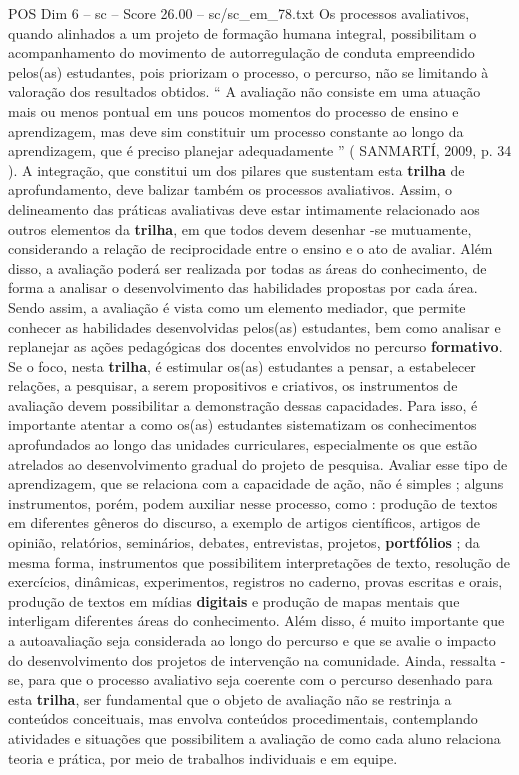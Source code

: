 \begin{textsample}{POS Dim 6 – sc – Score 26.00 – sc/sc\_em\_78.txt}
Os processos avaliativos, quando alinhados a um projeto de formação humana integral, possibilitam o acompanhamento do movimento de autorregulação de conduta empreendido pelos(as) estudantes, pois priorizam o processo, o percurso, não se limitando à valoração dos resultados obtidos. “ A avaliação não consiste em uma atuação mais ou menos pontual em uns poucos momentos do processo de ensino e aprendizagem, mas deve sim constituir um processo constante ao longo da aprendizagem, que é preciso planejar adequadamente ” ( SANMARTÍ, 2009, p. 34 ).
A integração, que constitui um dos pilares que sustentam esta \textbf{trilha} de aprofundamento, deve balizar também os processos avaliativos.
Assim, o delineamento das práticas avaliativas deve estar intimamente relacionado aos outros elementos da \textbf{trilha}, em que todos devem desenhar -se mutuamente, considerando a relação de reciprocidade entre o ensino e o ato de avaliar.
Além disso, a avaliação poderá ser realizada por todas as áreas do conhecimento, de forma a analisar o desenvolvimento das habilidades propostas por cada área.
Sendo assim, a avaliação é vista como um elemento mediador, que permite conhecer as habilidades desenvolvidas pelos(as) estudantes, bem como analisar e replanejar as ações pedagógicas dos docentes envolvidos no percurso \textbf{formativo}.
Se o foco, nesta \textbf{trilha}, é estimular os(as) estudantes a pensar, a estabelecer relações, a pesquisar, a serem propositivos e criativos, os instrumentos de avaliação devem possibilitar a demonstração dessas capacidades.
Para isso, é importante atentar a como os(as) estudantes sistematizam os conhecimentos aprofundados ao longo das unidades curriculares, especialmente os que estão atrelados ao desenvolvimento gradual do projeto de pesquisa.
Avaliar esse tipo de aprendizagem, que se relaciona com a capacidade de ação, não é simples ; alguns instrumentos, porém, podem auxiliar nesse processo, como : produção de textos em diferentes gêneros do discurso, a exemplo de artigos científicos, artigos de opinião, relatórios, seminários, debates, entrevistas, projetos, \textbf{portfólios} ; da mesma forma, instrumentos que possibilitem interpretações de texto, resolução de exercícios, dinâmicas, experimentos, registros no caderno, provas escritas e orais, produção de textos em mídias \textbf{digitais} e produção de mapas mentais que interligam diferentes áreas do conhecimento.
Além disso, é muito importante que a autoavaliação seja considerada ao longo do percurso e que se avalie o impacto do desenvolvimento dos projetos de intervenção na comunidade.
Ainda, ressalta -se, para que o processo avaliativo seja coerente com o percurso desenhado para esta \textbf{trilha}, ser fundamental que o objeto de avaliação não se restrinja a conteúdos conceituais, mas envolva conteúdos procedimentais, contemplando atividades e situações que possibilitem a avaliação de como cada aluno relaciona teoria e prática, por meio de trabalhos individuais e em equipe.


\end{textsample}
